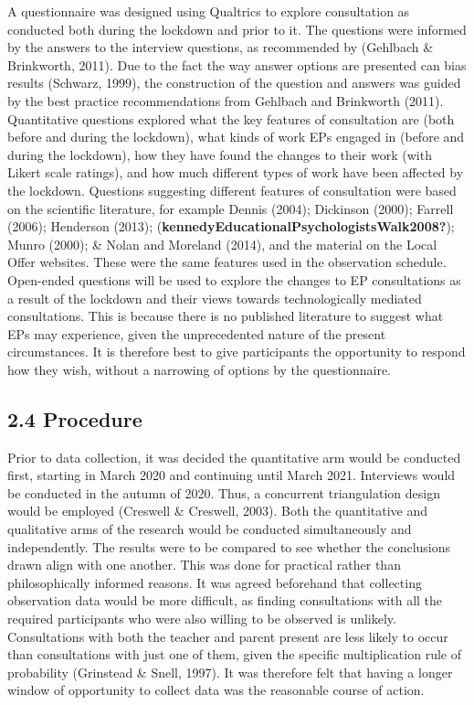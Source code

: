 \documentclass[
  english,
  man]{apa}
\begin{document}
A questionnaire was designed using Qualtrics to explore consultation as conducted both during the lockdown and prior to it. The questions were informed by the answers to the interview questions, as recommended by (Gehlbach \& Brinkworth, 2011). Due to the fact the way answer options are presented can bias results (Schwarz, 1999), the construction of the question and answers was guided by the best practice recommendations from Gehlbach and Brinkworth (2011). Quantitative questions explored what the key features of consultation are (both before and during the lockdown), what kinds of work EPs engaged in (before and during the lockdown), how they have found the changes to their work (with Likert scale ratings), and how much different types of work have been affected by the lockdown. Questions suggesting different features of consultation were based on the scientific literature, for example Dennis (2004); Dickinson (2000); Farrell (2006); Henderson (2013); (\textbf{kennedyEducationalPsychologistsWalk2008?}); Munro (2000); \& Nolan and Moreland (2014), and the material on the Local Offer websites. These were the same features used in the observation schedule. Open-ended questions will be used to explore the changes to EP consultations as a result of the lockdown and their views towards technologically mediated consultations. This is because there is no published literature to suggest what EPs may experience, given the unprecedented nature of the present circumstances. It is therefore best to give participants the opportunity to respond how they wish, without a narrowing of options by the questionnaire.

\hypertarget{procedure}{%
\subsection{2.4 Procedure}\label{procedure}}

Prior to data collection, it was decided the quantitative arm would be conducted first, starting in March 2020 and continuing until March 2021. Interviews would be conducted in the autumn of 2020. Thus, a concurrent triangulation design would be employed (Creswell \& Creswell, 2003). Both the quantitative and qualitative arms of the research would be conducted simultaneously and independently. The results were to be compared to see whether the conclusions drawn align with one another. This was done for practical rather than philosophically informed reasons. It was agreed beforehand that collecting observation data would be more difficult, as finding consultations with all the required participants who were also willing to be observed is unlikely. Consultations with both the teacher and parent present are less likely to occur than consultations with just one of them, given the specific multiplication rule of probability (Grinstead \& Snell, 1997). It was therefore felt that having a longer window of opportunity to collect data was the reasonable course of action.
\end{document}
